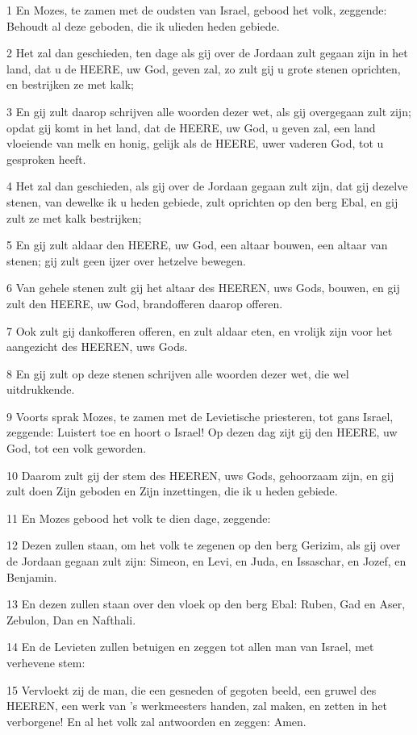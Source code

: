 \par 1 En Mozes, te zamen met de oudsten van Israel, gebood het volk, zeggende: Behoudt al deze geboden, die ik ulieden heden gebiede.
\par 2 Het zal dan geschieden, ten dage als gij over de Jordaan zult gegaan zijn in het land, dat u de HEERE, uw God, geven zal, zo zult gij u grote stenen oprichten, en bestrijken ze met kalk;
\par 3 En gij zult daarop schrijven alle woorden dezer wet, als gij overgegaan zult zijn; opdat gij komt in het land, dat de HEERE, uw God, u geven zal, een land vloeiende van melk en honig, gelijk als de HEERE, uwer vaderen God, tot u gesproken heeft.
\par 4 Het zal dan geschieden, als gij over de Jordaan gegaan zult zijn, dat gij dezelve stenen, van dewelke ik u heden gebiede, zult oprichten op den berg Ebal, en gij zult ze met kalk bestrijken;
\par 5 En gij zult aldaar den HEERE, uw God, een altaar bouwen, een altaar van stenen; gij zult geen ijzer over hetzelve bewegen.
\par 6 Van gehele stenen zult gij het altaar des HEEREN, uws Gods, bouwen, en gij zult den HEERE, uw God, brandofferen daarop offeren.
\par 7 Ook zult gij dankofferen offeren, en zult aldaar eten, en vrolijk zijn voor het aangezicht des HEEREN, uws Gods.
\par 8 En gij zult op deze stenen schrijven alle woorden dezer wet, die wel uitdrukkende.
\par 9 Voorts sprak Mozes, te zamen met de Levietische priesteren, tot gans Israel, zeggende: Luistert toe en hoort o Israel! Op dezen dag zijt gij den HEERE, uw God, tot een volk geworden.
\par 10 Daarom zult gij der stem des HEEREN, uws Gods, gehoorzaam zijn, en gij zult doen Zijn geboden en Zijn inzettingen, die ik u heden gebiede.
\par 11 En Mozes gebood het volk te dien dage, zeggende:
\par 12 Dezen zullen staan, om het volk te zegenen op den berg Gerizim, als gij over de Jordaan gegaan zult zijn: Simeon, en Levi, en Juda, en Issaschar, en Jozef, en Benjamin.
\par 13 En dezen zullen staan over den vloek op den berg Ebal: Ruben, Gad en Aser, Zebulon, Dan en Nafthali.
\par 14 En de Levieten zullen betuigen en zeggen tot allen man van Israel, met verhevene stem:
\par 15 Vervloekt zij de man, die een gesneden of gegoten beeld, een gruwel des HEEREN, een werk van 's werkmeesters handen, zal maken, en zetten in het verborgene! En al het volk zal antwoorden en zeggen: Amen.
